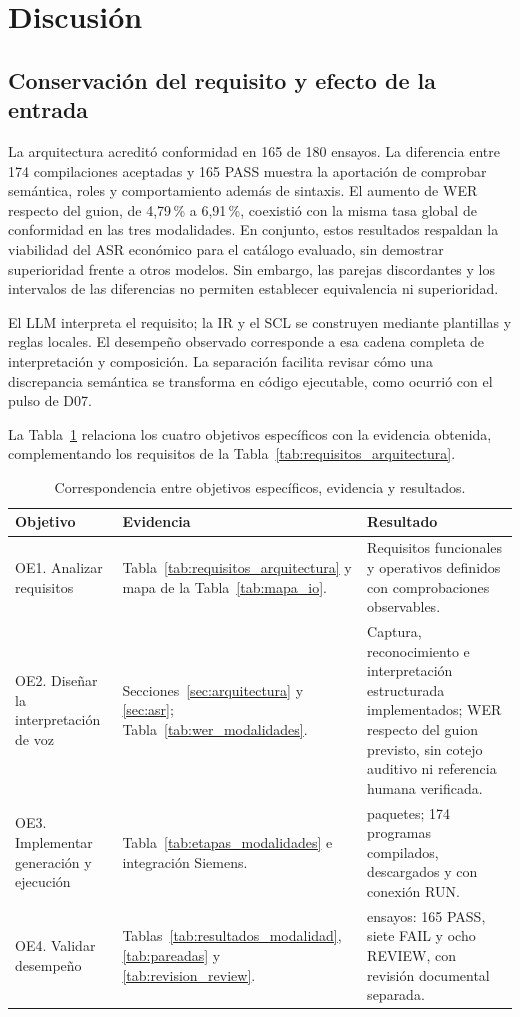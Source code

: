 \documentclass[a4paper,fleqn]{cas-dc}
\newcommand{\TituloDiscusion}{Discusión}
\newcommand{\TituloDiscusion}{Discussion}
\begin{document}
\section{\TituloDiscusion}
\label{sec:discusion}
\subsection{Conservación del requisito y efecto de la entrada}
La arquitectura acreditó conformidad en 165 de 180 ensayos. La diferencia entre 174 compilaciones aceptadas y 165 PASS muestra la aportación de comprobar semántica, roles y comportamiento además de sintaxis. El aumento de WER respecto del guion, de 4,79\,\% a 6,91\,\%, coexistió con la misma tasa global de conformidad en las tres modalidades. En conjunto, estos resultados respaldan la viabilidad del ASR económico para el catálogo evaluado, sin demostrar superioridad frente a otros modelos. Sin embargo, las parejas discordantes y los intervalos de las diferencias no permiten establecer equivalencia ni superioridad.

El LLM interpreta el requisito; la IR y el SCL se construyen mediante plantillas y reglas locales. El desempeño observado corresponde a esa cadena completa de interpretación y composición. La separación facilita revisar cómo una discrepancia semántica se transforma en código ejecutable, como ocurrió con el pulso de D07.

La Tabla~\ref{tab:objetivos_evidencia} relaciona los cuatro objetivos específicos con la evidencia obtenida, complementando los requisitos de la Tabla~\ref{tab:requisitos_arquitectura}.
\begin{table}[!tp]
\caption{Correspondencia entre objetivos específicos, evidencia y resultados.}
\label{tab:objetivos_evidencia}
\small
\begin{tabularx}{\textwidth}{@{}>{\raggedright\arraybackslash}p{} >{\raggedright\arraybackslash}X >{\raggedright\arraybackslash}X@{}}
\toprule Objetivo & Evidencia & Resultado\\ \midrule
OE1. Analizar requisitos & Tabla~\ref{tab:requisitos_arquitectura} y mapa de la Tabla~\ref{tab:mapa_io}. & Requisitos funcionales y operativos definidos con comprobaciones observables.\\
OE2. Diseñar la interpretación de voz & Secciones~\ref{sec:arquitectura} y \ref{sec:asr}; Tabla~\ref{tab:wer_modalidades}. & Captura, reconocimiento e interpretación estructurada implementados; WER respecto del guion previsto, sin cotejo auditivo ni referencia humana verificada.\\
OE3. Implementar generación y ejecución & Tabla~\ref{tab:etapas_modalidades} e integración Siemens. & 176 paquetes; 174 programas compilados, descargados y con conexión RUN.\\
OE4. Validar desempeño & Tablas~\ref{tab:resultados_modalidad}, \ref{tab:pareadas} y \ref{tab:revision_review}. & 180 ensayos: 165 PASS, siete FAIL y ocho REVIEW, con revisión documental separada.\\
\bottomrule
\end{tabularx}
\end{table}
\end{document}
